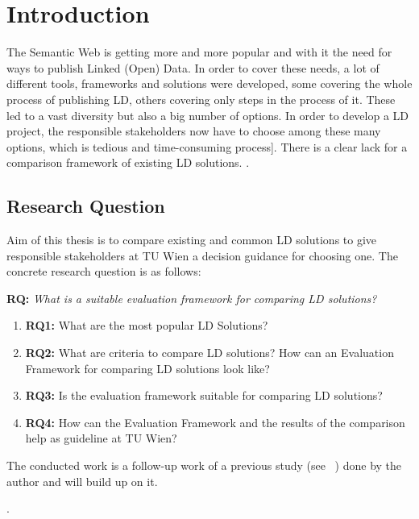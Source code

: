 \chapter{Introduction}

The Semantic Web is getting more and more popular and with it the need for ways to publish Linked (Open) Data. In order to cover these needs, a lot of different tools, frameworks and solutions were developed, some covering the whole process of publishing LD, others covering only steps in the process of it. These led to a vast diversity but also a big number of options. In order to develop a LD project, the responsible stakeholders now have to choose among these many options, which is tedious and time-consuming process]. There is a clear lack for a comparison framework of existing LD solutions. .

\section{Research Question}

Aim of this thesis is to compare existing and common LD solutions to give responsible stakeholders at TU Wien a decision guidance for choosing one. The concrete research question is as follows:

\textbf{RQ:} \textit{What is a suitable evaluation framework for comparing LD solutions?}
\begin{enumerate}
\item \textbf{RQ1:} What are the most popular LD Solutions?
\item \textbf{RQ2:} What are criteria to compare LD solutions? How can an Evaluation Framework for comparing LD solutions look like?
\item \textbf{RQ3:} Is the evaluation framework suitable for comparing LD solutions? 
\item \textbf{RQ4:} How can the Evaluation Framework and the results of the comparison help as guideline at TU Wien?
\end{enumerate}

The conducted work is a follow-up work of a previous study (see ~\cite{baronyai_publishing_2016}) done by the author and will build up on it.

.

